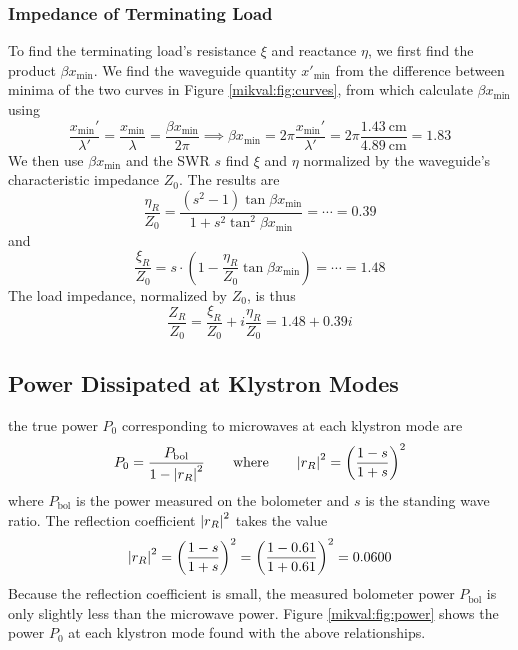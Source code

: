 \documentclass[11pt, a4paper]{article}
\newcommand{\eqtext}[1]{\qquad \text{#1} \qquad}
\begin{document}
\subsubsection{Impedance of Terminating Load}
To find the terminating load's resistance $ \xi $ and reactance $ \eta $, we first find the product $ \beta x_{\text{min}} $. We find the waveguide quantity $ x'_{\text{min}} $ from the difference between minima of the two curves in Figure \ref{mikval:fig:curves}, from which calculate $  \beta x_{\text{min}}  $ using
\begin{equation*}
	\frac{x_{\text{min}}'}{\lambda'} = \frac{x_{\text{min}}}{\lambda} = \frac{\beta x_{\text{min}}}{2\pi} \implies \beta x_{\text{min}} = 2\pi \frac{x_{\text{min}}'}{\lambda'} = 2\pi \frac{\SI{1.43}{\centi \meter}}{\SI{4.89}{\centi \meter}} = 1.83
\end{equation*}
We then use $ \beta x_{\text{min}} $ and the SWR $ s $ find $ \xi $ and $ \eta $ normalized by the waveguide's characteristic impedance $ Z_{0} $. The results are
\begin{equation*}
	\frac{\eta_{R}}{Z_{0}} = \frac{(s^{2} - 1) \tan \beta x_{\text{min}}}{1 + s^{2}\tan^{2}\beta x_{\text{min}}} = \cdots = 0.39
\end{equation*}
and 
\begin{equation*}
	\frac{\xi_{R}}{Z_{0}} = s \cdot \left(1 - \frac{\eta_{R}}{Z_{0}}\tan \beta x_{\text{min}}\right) = \cdots = 1.48
\end{equation*}
The load impedance, normalized by $ Z_{0} $, is thus
\begin{equation*}
	\frac{Z_{R}}{Z_{0}} = \frac{\xi_{R}}{Z_{0}} + i\frac{\eta_{R}}{Z_{0}} = 1.48 + 0.39 i
\end{equation*}


\subsection{Power Dissipated at Klystron Modes}
the true power $ P_{\text{0}} $ corresponding to microwaves at each klystron mode are
\begin{equation*}
	P_{0} = \frac{P_{\text{bol}}}{1 - \abs{r_{R}}^{2}} \eqtext{where}  \abs{r_{R}}^{2} = \left(\frac{1 - s}{1 + s}\right )^{2}
\end{equation*}
where $ P_{\text{bol}} $ is the power measured on the bolometer and $ s $ is the standing wave ratio. The reflection coefficient $ \abs{r_{R}}^{2} $ takes the value
\begin{equation*}
	\abs{r_{R}}^{2} = \left(\frac{1 - s}{1 + s}\right )^{2} = \left(\frac{1 - 0.61}{1 + 0.61}\right)^{2} = 0.0600
\end{equation*}
Because the reflection coefficient is small, the measured bolometer power $ P_{\text{bol}} $ is only slightly less than the microwave power. Figure \ref{mikval:fig:power} shows the power $ P_{0} $  at each klystron mode found with the above relationships.
\end{document}
